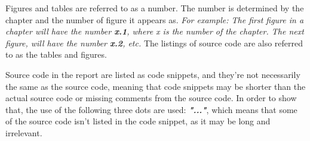 Figures and tables are referred to as a number. The number is determined by the chapter and the number of figure it appears as. \newline
\textit{For example: The first figure in a chapter will have the number \textbf{x.1}, where x is the number of the chapter. The next figure, will have the number \textbf{x.2}, etc.}
\newline
The listings of source code are also referred to as the tables and figures. 

Source code in the report are listed as code snippets, and they're not necessarily the same as the source code, meaning that code snippets may be shorter than the actual source code or missing comments from the source code. In order to show that, the use of the following three dots are used: \textit\textbf{{"..."}}, which means that some of the source code isn't listed in the code snippet, as it may be long and irrelevant. 

